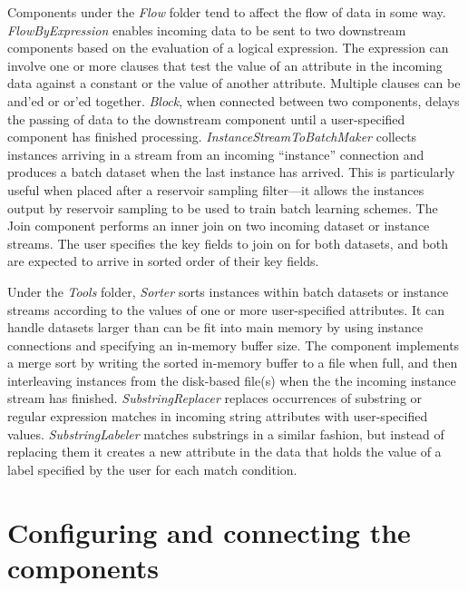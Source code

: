 Components under the \textit{Flow} folder tend to affect the flow of
data in some way. \textit{FlowByExpression} enables incoming data to
be sent to two downstream components based on the evaluation of a
logical expression. The expression can involve one or more clauses
that test the value of an attribute in the incoming data against a
constant or the value of another attribute. Multiple clauses can be
and'ed or or'ed together. \textit{Block}, when connected between two
components, delays the passing of data to the downstream component
until a user-specified component has finished
processing. \textit{InstanceStreamToBatchMaker} collects instances
arriving in a stream from an incoming ``instance'' connection and
produces a batch dataset when the last instance has arrived. This is
particularly useful when placed after a reservoir sampling filter---it
allows the instances output by reservoir sampling to be used to train
batch learning schemes. The Join component performs an inner join on
two incoming dataset or instance streams. The user specifies the key
fields to join on for both datasets, and both are expected to arrive
in sorted order of their key fields.

Under the \textit{Tools} folder, \textit{Sorter} sorts instances
within batch datasets or instance streams according to the values of
one or more user-specified attributes. It can handle datasets larger
than can be fit into main memory by using instance connections and
specifying an in-memory buffer size. The component implements a merge
sort by writing the sorted in-memory buffer to a file when full, and
then interleaving instances from the disk-based file(s) when the the
incoming instance stream has finished. \textit{SubstringReplacer}
replaces occurrences of substring or regular expression matches in
incoming string attributes with user-specified
values. \textit{SubstringLabeler} matches substrings in a similar
fashion, but instead of replacing them it creates a new attribute in
the data that holds the value of a label specified by the user for
each match condition.

\section{Configuring and connecting the components}

